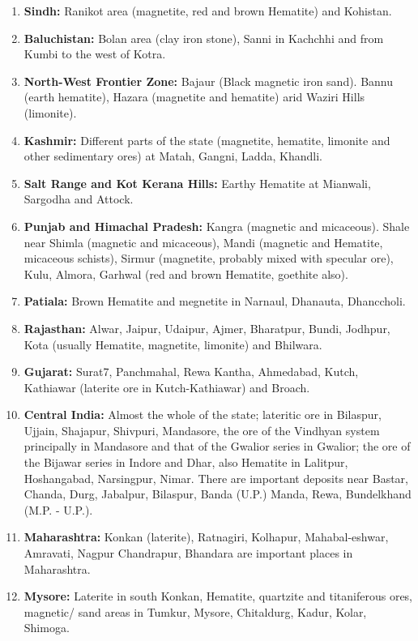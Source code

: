 \begin{enumerate}
\renewcommand{\theenumi}{\arabic{enumi}.}
\renewcommand{\labelenumi}{\bf \theenumi}
\itemsep=0pt
\item {\bf Sindh:} Ranikot area (magnetite, red and brown Hematite) and Kohistan.
\item {\bf Baluchistan:} Bolan area (clay iron stone), Sanni in Kachchhi and from Kumbi to the west of Kotra.
\item {\bf North-West Frontier Zone:} Bajaur (Black magnetic iron sand). Bannu (earth hematite), Hazara (magnetite and hematite) arid Waziri Hills (limonite).
\item {\bf Kashmir:} Different parts of the state (magnetite, hematite, limonite and other sedimentary ores) at Matah, Gangni, Ladda, Khandli. 
\item {\bf Salt Range and Kot Kerana Hills:} Earthy Hematite at Mianwali, Sargodha and Attock.
\item {\bf Punjab and Himachal Pradesh:} Kangra (magnetic and micaceous). Shale near  Shimla (magnetic and micaceous), Mandi (magnetic and Hematite, micaceous schists), Sirmur (magnetite, probably mixed with specular ore), Kulu, Almora, Garhwal (red and brown Hematite, goethite also).
\item {\bf Patiala:} Brown Hematite and megnetite in Narnaul, Dhanauta, Dhanccholi.
\item {\bf Rajasthan:} Alwar, Jaipur, Udaipur, Ajmer, Bharatpur, Bundi, Jodhpur, Kota (usually Hematite, magnetite, limonite) and Bhilwara.
\item {\bf Gujarat:} Surat7, Panchmahal, Rewa Kantha, Ahmedabad, Kutch, Kathiawar (laterite ore in Kutch-Kathiawar) and Broach.
\item {\bf  Central India:} Almost the whole of the state; lateritic ore in Bilaspur, Ujjain, Shajapur, Shivpuri, Mandasore, the ore of the Vindhyan system principally in Mandasore and that of the Gwalior series in Gwalior; the ore of the Bijawar series in Indore and Dhar, also Hematite in Lalitpur, Hoshangabad, Narsingpur, Nimar. There are important deposits near Bastar, Chanda, Durg, Jabalpur, Bilaspur, Banda (U.P.) Manda, Rewa, Bundelkhand (M.P. - U.P.).
\item {\bf Maharashtra:} Konkan (laterite), Ratnagiri, Kolhapur, Mahabal-\break eshwar, Amravati, Nagpur Chandrapur, Bhandara are important places in Maharashtra.
\item {\bf Mysore:} Laterite in south Konkan, Hematite, quartzite and titaniferous ores, mag­netic/ sand areas in Tumkur, Mysore, Chitaldurg, Kadur, Kolar, Shimoga.

\end{enumerate}
